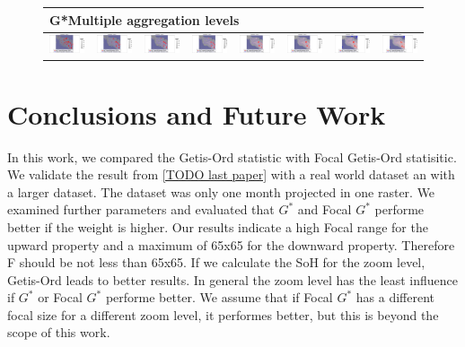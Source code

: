 \documentclass{itatnew}
\begin{document}
\begin{figure}[htp]
  \begin{tabular}{cccccccc}
    \hline
    \multicolumn{8}{l}{G*Multiple aggregation levels} \\
    \hline
    \includegraphics[width=4.6em]{images/gen-demo-zoom-gstar-1}&
    \includegraphics[width=4.6em]{images/gen-demo-zoom-gstar-2}&
    \includegraphics[width=4.6em]{images/gen-demo-zoom-gstar-3}&
    \includegraphics[width=4.6em]{images/gen-demo-zoom-gstar-4}&
    \includegraphics[width=4.6em]{images/gen-demo-zoom-gstar-5}&
    \includegraphics[width=4.6em]{images/gen-demo-zoom-gstar-6}&
    \includegraphics[width=4.6em]{images/gen-demo-zoom-gstar-7}&
    \includegraphics[width=4.6em]{images/gen-demo-zoom-gstar-8}
  \end{tabular}
  
\end{figure}





\section{Conclusions and Future Work} \label{sec:Conclusion}
In this work, we compared the Getis-Ord statistic with Focal Getis-Ord statisitic. We validate the result from \ref{TODO last paper} with a real world 
dataset an with a larger dataset. The dataset was only one month projected in one raster. 
We examined further parameters and evaluated that $G^*$ and Focal $G^*$ performe better if the weight
is higher.
Our results indicate a high Focal range for the upward property and a maximum of 65x65 for the downward property.
Therefore F should be not less than 65x65. 
If we calculate the SoH for the zoom level, Getis-Ord leads to better results. In general the zoom level 
has the least influence if $G^*$ or Focal $G^*$ performe better.
We assume that if Focal $G^*$ has a different focal size for a different zoom level, 
it performes better, but this is beyond the scope of this work.
\end{document}
